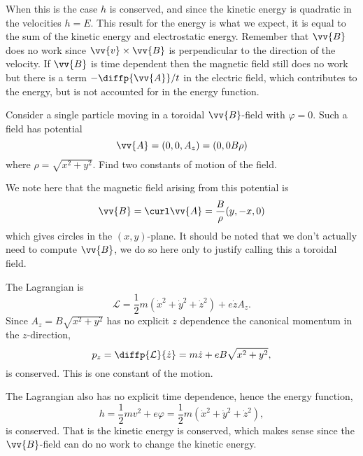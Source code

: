 \documentclass[fleqn]{NotesClass}
\newcommand*{\lagrangian}{\mathcal{L}}
\begin{document}
    When this is the case \(h\) is conserved, and since the kinetic energy is quadratic in the velocities \(h = E\).
    This result for the energy is what we expect, it is equal to the sum of the kinetic energy and electrostatic energy.
    Remember that \(\vv{B}\) does no work since \(\vv{v} \times \vv{B}\) is perpendicular to the direction of the velocity.
    If \(\vv{B}\) is time dependent then the magnetic field still does no work but there is a term \(-\diffp{\vv{A}}/{t}\) in the electric field, which contributes to the energy, but is not accounted for in the energy function.
    
    \begin{exm}{}{}
        Consider a single particle moving in a toroidal \(\vv{B}\)-field with \(\varphi = 0\).
        Such a field has potential
        \begin{equation}
            \vv{A} = (0, 0, A_z) = (0, 0 B\rho)
        \end{equation}
        where \(\rho = \sqrt{x^2 + y^2}\).
        Find two constants of motion of the field.
        
        We note here that the magnetic field arising from this potential is
        \begin{equation}
            \vv{B} = \curl\vv{A} = \frac{B}{\rho} (y, -x, 0)
        \end{equation}
        which gives circles in the \((x, y)\)-plane.
        It should be noted that we don't actually need to compute \(\vv{B}\), we do so here only to justify calling this a toroidal field.
        
        The Lagrangian is
        \begin{equation}
            \lagrangian = \frac{1}{2}m(\dot{x}^2 + \dot{y}^2 + \dot{z}^2) + e\dot{z}A_z.
        \end{equation}
        Since \(A_z = B\sqrt{x^2 + y^2}\) has no explicit \(z\) dependence the canonical momentum in the \(z\)-direction,
        \begin{equation}
            p_z = \diffp{\lagrangian}{\dot{z}} = m\dot{z} + eB\sqrt{x^2 + y^2},
        \end{equation}
        is conserved.
        This is one constant of the motion.
        
        The Lagrangian also has no explicit time dependence, hence the energy function,
        \begin{equation}
            h = \frac{1}{2}mv^2 + e\varphi = \frac{1}{2}m(\dot{x}^2 + \dot{y}^2 + \dot{z}^2),
        \end{equation}
        is conserved.
        That is the kinetic energy is conserved, which makes sense since the \(\vv{B}\)-field can do no work to change the kinetic energy.
    \end{exm}
    
\end{document}
